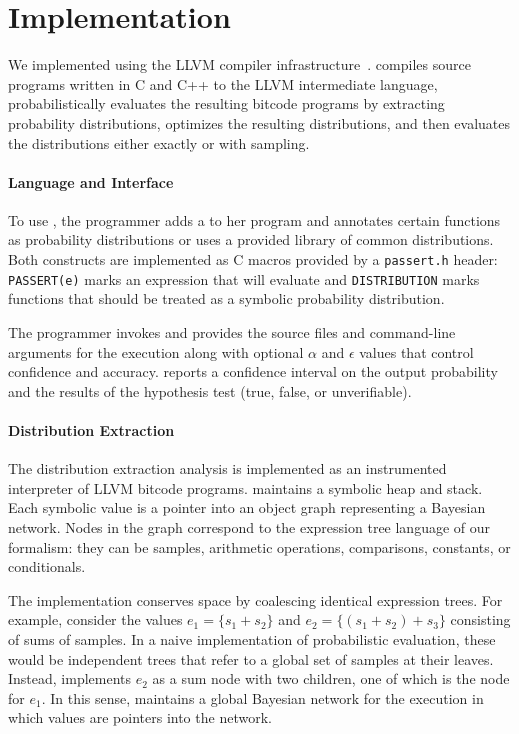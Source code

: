 \section{Implementation}
\label{sec:implementation}

We implemented \tool using the LLVM compiler infrastructure~\cite{llvm}. \tool
compiles source programs written in C and C++ to the LLVM intermediate
language, probabilistically evaluates the resulting bitcode programs by extracting
probability distributions, optimizes the resulting distributions, and
then evaluates the \passert distributions either exactly or with sampling.

\paragraph{Language and Interface}

To use \tool, the programmer adds a \passert to her program and annotates
certain functions as probability distributions or uses a provided library of
common distributions. Both constructs are implemented as C macros provided by
a \texttt{passert.h} header: \texttt{PASSERT(e)} marks an expression that
\tool will evaluate and \texttt{DISTRIBUTION} marks functions
that should be treated as a symbolic probability distribution.

The programmer invokes \tool and provides the source files and command-line
arguments for the execution along with optional $\alpha$ and $\epsilon$ values
that control confidence and accuracy. \tool reports a confidence interval on
the output probability and the results of the hypothesis test (true, false, or
unverifiable).

\paragraph{Distribution Extraction}

The distribution extraction analysis is implemented as an instrumented
interpreter of LLVM bitcode programs. \tool maintains a symbolic heap and
stack. Each symbolic value is a pointer into an object graph representing a
Bayesian network. Nodes in the graph correspond to the expression tree language of
our formalism: they can be samples, arithmetic operations, comparisons,
constants, or conditionals.

The implementation conserves space by coalescing identical expression trees.
For example, consider the values
$e_1 = \{ s_1 + s_2 \}$ and $e_2 = \{ (s_1 + s_2) + s_3 \}$ consisting of sums of samples.
In a naive implementation of probabilistic evaluation, these would be independent trees
that refer to a global set of samples at their leaves.
Instead, \tool implements $e_2$ as a sum node with two
children, one of which is the node for $e_1$.
In this sense, \tool maintains a global Bayesian network for the
execution in which
values are pointers into the network.

